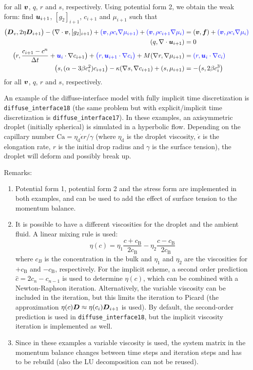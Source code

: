 for all $\boldsymbol{v}$, $q$, $r$ and $s$, respectively. Using potential form 2, we 
obtain the weak form:
find $\boldsymbol{u}_{i+1}$, $[g_2]_{i+1}$, $c_{i+1}$ and $\mu_{i+1}$ such that
\begin{alignat*}{6}
\big(\boldsymbol{D}_v,2\eta \boldsymbol{D}_{i+1} \big) -(\nabla\cdot\boldsymbol{v},[g_2]_{i+1})   
+\textcolor{blue}{( \boldsymbol{v}, \rho c_{i}\nabla \mu_{i+1})}+\textcolor{blue}{( \boldsymbol{v}, \rho c_{i+1} 
	\nabla \mu_{i})}&=(\boldsymbol{v},\boldsymbol{f})+\textcolor{blue}{(\boldsymbol{v},\rho c_{i}\nabla \mu_{i})}\\
(q,\nabla\cdot\boldsymbol{u}_{i+1})&=0\\
\big(r,\frac{c_{i+1}-c^n}{\Delta t}+\textcolor{blue}{\boldsymbol{u}_i}\cdot\nabla c_{i+1}\big) 
+\textcolor{blue}{\big(r, \boldsymbol{u}_{i+1} \cdot \nabla c_i \big)}+M(\nabla r,\nabla
\mu_{i+1})&=\textcolor{blue}{(r, \boldsymbol{u}_i \cdot \nabla c_i)} \\
\big(s, (\alpha -3\beta c_{i}^2)c_{i+1}\big)-\kappa(\nabla s,\nabla c_{i+1}) 
+(s,\mu_{i+1})&=-\big(s, 2\beta c_{i}^3 \big)
\end{alignat*}
for all $\boldsymbol{v}$, $q$, $r$ and $s$, respectively.

An example of the diffuse-interface model with fully implicit time 
discretization is \texttt{diffuse\_interface18} (the same problem but with 
explicit/implicit time discretization is  \texttt{diffuse\_interface17}). In 
these examples, an axisymmetric droplet (initially spherical) is simulated in a 
hyperbolic flow. Depending on the capillary number 
$\text{Ca}=\eta_\text{d}\dot{\epsilon} r / \gamma$ (where 
$\eta_\text{d}$ is the droplet viscosity, $\dot{\epsilon}$ is the elongation 
rate, $r$ is the initial drop radius and $\gamma$ is the surface tension), the 
droplet will deform and possibly break up.

Remarks:
\begin{enumerate}
	\item Potential form 1, potential form 2 and the stress 
	form are implemented in both examples, and can be used to add the
        effect of surface tension to the momentum balance.
	\item It is possible to have a different viscosities for 
	the droplet and the ambient fluid. A linear mixing rule is used:
	\[
	\eta(c) = \eta_1 \frac{c+c_\text{B}}{2c_\text{B}} - \eta_2   
	\frac{c-c_\text{B}}{2c_\text{B}}
	\]
	where $c_B$ is the concentration in the bulk and $\eta_1$ and $\eta_2$ 
        are the viscosities for $+c_\text{B}$ and $-c_\text{B}$, respectively. 
	For the implicit scheme, a second order prediction 
        $\hat{c}=2c_n-c_{n-1}$ is used to determine 
	$\eta(c)$, which can be combined with a Newton-Raphson iteration.
	Alternatively, the variable viscosity can be included in the iteration,
        but this limits the  
	iteration to Picard (the approximation $\eta(c)\boldsymbol{D} \approx 
	\eta(c_i)\boldsymbol{D}_{i+1}$ is used). By default, the second-order prediction
        is used in \texttt{diffuse\_interface18}, but the implicit viscosity 
        iteration is implemented as well.
	\item Since in these examples a variable viscosity is used, the system 
	matrix in the momentum 
	balance changes between time steps and iteration steps and has to be 
	rebuild (also the LU decomposition can not be reused).
\end{enumerate}
